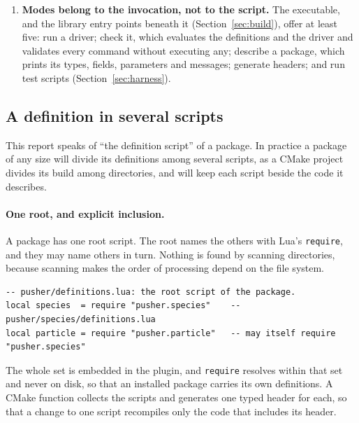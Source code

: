 \documentclass[11pt,a4paper]{article}
\newcommand{\code}[1]{\texttt{#1}}
\begin{document}
\begin{enumerate}
        owner does so only through the schema version and a migration
        (Section~\ref{sec:schema-record}).  The owner of a type also decides
        whether a driver may create and delete its rows directly, or only
        through the package's own commands (Section~\ref{sec:modification}).
  \item \textbf{Modes belong to the invocation, not to the script.}  The
        executable, and the library entry points beneath it
        (Section~\ref{sec:build}), offer at least five: run a driver; check
        it, which evaluates the definitions and the driver and validates
        every command without executing any; describe a package, which
        prints its types, fields, parameters and messages; generate
        headers; and run test scripts (Section~\ref{sec:harness}).
\end{enumerate}

\subsection{A definition in several scripts}
\label{sec:definition-scripts}

This report speaks of \enquote{the definition script} of a package.  In
practice a package of any size will divide its definitions among several
scripts, as a CMake project divides its build among directories, and will
keep each script beside the code it describes.

\paragraph{One root, and explicit inclusion.}  A package has one root
script.  The root names the others with Lua's \code{require}, and they may
name others in turn.  Nothing is found by scanning directories, because
scanning makes the order of processing depend on the file system.

\begin{lstlisting}[language={[5.3]Lua}]
-- pusher/definitions.lua: the root script of the package.
local species  = require "pusher.species"    -- pusher/species/definitions.lua
local particle = require "pusher.particle"   -- may itself require "pusher.species"
\end{lstlisting}

The whole set is embedded in the plugin, and \code{require} resolves within
that set and never on disk, so that an installed package carries its own
definitions.  A CMake function collects the scripts and generates one typed
header for each, so that a change to one script recompiles only the code
that includes its header.
\end{document}
